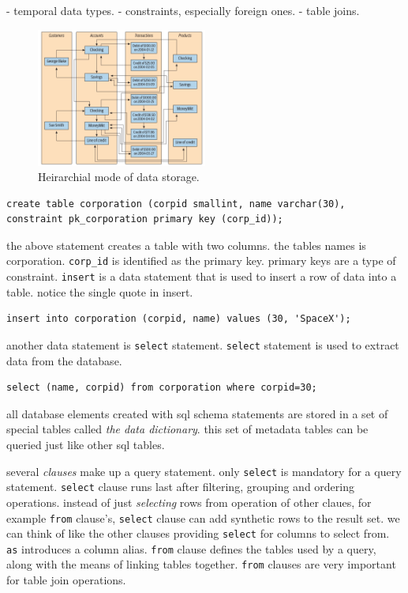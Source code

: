 \documentclass[a4paper]{article}
\begin{document}
- temporal data types.
- constraints, especially foreign ones.
- table joins.

\begin{figure}[hbt!]
    \centering
    \includegraphics[width=0.5\textwidth]{graphics/network-database.png}
    \caption{Heirarchial mode of data storage.}
\end{figure}

\begin{lstlisting}
create table corporation (corpid smallint, name varchar(30), constraint pk_corporation primary key (corp_id));
\end{lstlisting}

the above statement creates a table with two columns. the tables names is corporation. \lstinline{corp_id} is identified as the 
primary key. primary keys are a type of constraint. \lstinline{insert} is a data statement that is used to insert a row of data into
a table. notice the single quote in insert.

\begin{lstlisting}
insert into corporation (corpid, name) values (30, 'SpaceX');
\end{lstlisting}

another data statement is \lstinline{select} statement. \lstinline{select} statement is used to extract data from the database.

\begin{lstlisting}
select (name, corpid) from corporation where corpid=30;
\end{lstlisting}

all database elements created with sql schema statements are stored in a set of special tables called \emph{the data dictionary}.
this set of metadata tables can be queried just like other sql tables.

several \emph{clauses} make up a query statement. only \lstinline{select} is mandatory for a query statement. \lstinline{select}
clause runs last after filtering, grouping and ordering operations. instead of just \emph{selecting} rows from operation of other
claues, for example \lstinline{from} clause's, \lstinline{select} clause can add synthetic rows to the result set. we can think of
like the other clauses providing \lstinline{select} for columns to select from. \lstinline{as} introduces a column alias.
\lstinline{from} clause defines the tables used by a query, along with the means of linking tables together. \lstinline{from} clauses 
are very important for table join operations.
\end{document}
